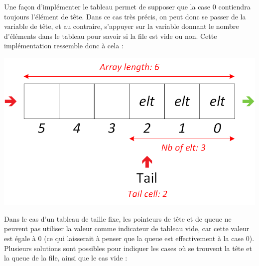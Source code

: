 Une façon d'implémenter le tableau permet de supposer que la case $ 0 $ contiendra toujours l'élément de tête.
Dans ce cas très précis, on peut donc se passer de la variable de tête, et au contraire, s'appuyer sur la variable donnant le nombre d'éléments dans le tableau pour savoir si la file est vide ou non.
Cette implémentation ressemble donc à cela :\\

\begin{center}
\includegraphics[scale=1]{Cours/Files_5_Tableau_Statique_Structure_Detaillee_2.png}
\end{center}

\smallskip

Dans le cas d'un tableau de taille fixe, les pointeurs de tête et de queue ne peuvent pas utiliser la valeur  comme indicateur de tableau vide, car cette valeur est égale à $ 0 $ (ce qui laisserait à penser que la queue est effectivement à la case 0).
Plusieurs solutions sont possibles pour indiquer les cases où se trouvent la tête et la queue de la file, ainsi que le cas vide :

